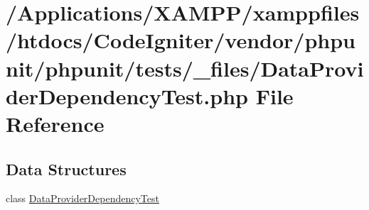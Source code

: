 \hypertarget{_data_provider_dependency_test_8php}{}\section{/\+Applications/\+X\+A\+M\+P\+P/xamppfiles/htdocs/\+Code\+Igniter/vendor/phpunit/phpunit/tests/\+\_\+files/\+Data\+Provider\+Dependency\+Test.php File Reference}
\label{_data_provider_dependency_test_8php}
\subsection*{Data Structures}
\begin{DoxyCompactItemize}
\item 
class \mbox{\hyperlink{class_data_provider_dependency_test}{Data\+Provider\+Dependency\+Test}}
\end{DoxyCompactItemize}

